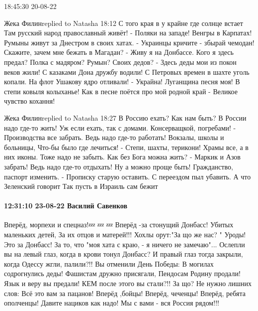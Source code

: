  
 
 
 
 

18:45:30 20-08-22

Жека Филинreplied to Natasha
18:12
С того края в у крайне где солнце встает
Там русский народ православный живёт!
-
Поляки на западе! Венгры в Карпатах!
Румыны живут за Днестром в своих хатах.
-
Украинцы кричите - збырай чемодан!
Скажите, зачем мне бежать в Магадан?
-
Живу я на Донбассе.
Кого я здесь предал?
Полка с мадяром? Румын?
Своих дедов?
-
Здесь деды мои из покон веков жили!
С казаками Дона дружбу водили!
С Петровых времен в шахте уголь копали.
На флот Ушакову ядро отливали!
-
Украйна! Луганщина песня моя!
В степи ковыля колыханье!
Как в песне поётся про мой родной край -
Великое чувство кохання!

Жека Филинreplied to Natasha
18:27
В Россию ехать?
Как нам быть?
В России надо где-то жить!
Уж если ехать, так с домами.
Консерващкой, погребами!
-
Производства все забрать.
Ведь надо где-то работать!
Вокзалы, школы и больницы,
Что-бы было где лечиться!
-
Степи, шахты, терикони!
Храмы все, а в них иконы.
Тоже надо не забыть.
Как без Бога можна жить?
-
Маркик и Азов забрать!
Ведь надо где-то отдыхать!
Ну а можно проще быть!
Гражданство, паспорт изменить.
-
Прописку старую оставить. 
С переездом пыл убавить. 
А что Зеленский говорит 
Так пусть в Израиль сам бежит

\paragraph{12:31:10 23-08-22 Василий Савенков}

Вперёд, морпехи и спецназ!💤 💤 💤
Вперёд -за стонущий Донбасс!
Убитых маленьких детей,
За их отцов и матерей!!!
Хохлы орут:"За що же нас? "
Уроды! Это за Донбасс!
За то, что "моя хата с краю, -
я ничего не замечаю"...
Ослепли вы на левый глаз,
когда в крови тонул Донбасс?
И правый глаз тогда закрыли,
когда Одессу жгли, палили?!!
Вы отменили День Победы:
В могилах содрогнулись деды!
Фашистам дружно присягали,
Пендосам Родину продали!
Язык и веру вы предали!
КЕМ после этого вы стали?!!
За що? Не нужно лишних слов:
Всё это вам за пацанов!
Вперёд ,бойцы! Вперёд, чеченцы!
Вперёд, ребята ополченцы!
Давите нациков как надо!
Мы с вами - вся Россия рядом!!!


